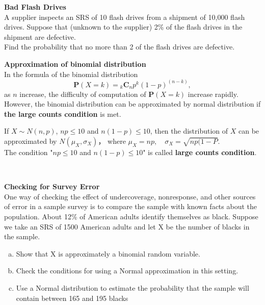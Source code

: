 \documentclass[a4paper, 12pt,twoside]{book}
\begin{document}
  \noindent \colorbox{champagne}{\parbox{\textwidth}{
  \textbf{Bad Flash Drives}\vspace{0.3cm}\\
  A supplier inspects an SRS of 10 flash drives from a shipment of 10,000 flash drives. Suppose that (unknown to the supplier) 2\% of the flash drives in the shipment are defective. \vspace{0.3cm}\\
  Find the probability that no more than 2 of the flash drives are defective.
  }}
       \newpage
       
      \noindent \textbf{Approximation of binomial distribution}\vspace{0.6cm}\\
      
      In the formula of the binomial distribution
      $$\textbf{P}(X=k) = {}_k\textbf{C}_n p^k(1-p)^{(n-k)},$$
      as $n$ increase, the difficulty of computation of $\textbf{P}(X=k)$ increase rapidly. However, the binomial distribution can be approximated by normal distribution if \textbf{the large counts condition} is met.\vspace{0.3cm}\\
      \colorbox{babypink}{\parbox{\textwidth}{
     If  $X \sim N(n, p)$, $np \leq 10$ and $n(1-p) \leq 10$, then the distribution of $X$ can be approximated by $N(\mu_X, \sigma_X)$， where $\mu_X=np, \quad \sigma_X = \sqrt{np(1-P}$. \vspace{0.3cm}\\
     The condition "$np \leq 10$ and $n(1-p) \leq 10$" is called \textbf{large counts condition}.
      }} \vspace{0.6cm}\\
      \colorbox{champagne}{\parbox{\textwidth}{
      \textbf{Checking for Survey Error}\vspace{0.3cm}\\
      One way of checking the effect of undercoverage, nonresponse, and other sources of error in a sample survey is to compare the sample with known facts about the population. About 12\% of American adults identify themselves as black. Suppose we take an SRS of 1500 American adults and let X be the number of blacks in the sample.
      \begin{enumerate}[(a)]
          \item Show that X is approximately a binomial random variable.
          \item Check the conditions for using a Normal approximation in this setting.
          \item Use a Normal distribution to estimate the probability that the sample will contain between 165 and 195 blacks
      \end{enumerate}
      }}
      \newpage
      
\end{document}

